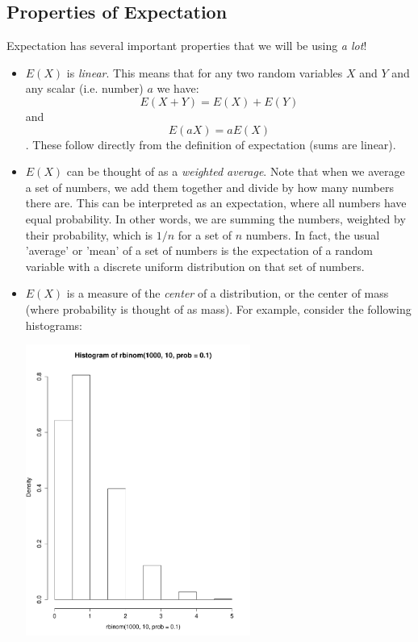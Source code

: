\documentclass[12pt]{article} %
\begin{document}
\subsection{Properties of Expectation}
Expectation has several important properties that we will be using \emph{a lot}!
\begin{itemize}
\item $E(X)$ is \emph{linear}. This means that for any two random variables $X$ and $Y$ and any scalar (i.e. number) $a$ we have:
$$E(X+Y) = E(X) + E(Y)$$
and
$$E(aX) = aE(X)$$.
These follow directly from the definition of expectation (sums are linear).
\item $E(X)$ can be thought of as a \emph{weighted average}. Note that when we average a set of numbers, we add them together and divide by how many numbers there are. This can be interpreted as an expectation, where all numbers have equal probability. In other words, we are summing the numbers, weighted by their probability, which is $1/n$ for a set of $n$ numbers. In fact, the usual 'average' or 'mean' of a set of numbers is the expectation of a random variable with a discrete uniform distribution on that set of numbers. 
\item $E(X)$ is a measure of the \emph{center} of a distribution, or the center of mass (where probability is thought of as mass). For example, consider the following histograms:
\begin{minipage}{3in}
\includegraphics[width=2.9in]{rbinom.pdf}
\end{minipage}
\begin{minipage}{3in}

\end{minipage}
\end{itemize}
\end{document}
